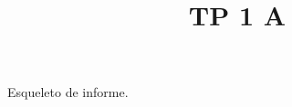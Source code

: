 \documentclass[spanish]{article}
\begin{document}
\title{TP 1 A}

Esqueleto de informe.
\end{document}
